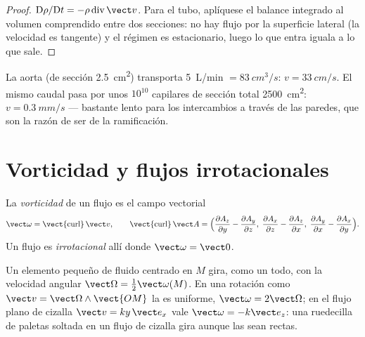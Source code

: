 \begin{proof}
$\mathrm D\rho/\mathrm Dt = -\rho\operatorname{div}\vect v$. Para el tubo,
aplíquese el balance integrado al volumen comprendido entre dos secciones:
no hay flujo por la superficie lateral (la velocidad es tangente) y el
régimen es estacionario, luego lo que entra iguala a lo que sale.
\end{proof}

\begin{example}[La sangre]\label{ex:b2:fluid-kinematics:blood}
La aorta (de sección \qty{2.5}{cm^2}) transporta \qty{5}{L/min} $= \qty{83}{cm^3/s}$:
$v = \qty{33}{cm/s}$. El mismo caudal pasa por unos $10^{10}$
capilares de sección total \qty{2500}{cm^2}: $v = \qty{0.3}{mm/s}$ ---
bastante lento para los intercambios a través de las paredes, que son la razón de ser de la ramificación.
\end{example}

\section{Vorticidad y flujos irrotacionales}

\begin{definition}[Vorticidad]\label{def:b2:fluid-kinematics:vorticity}
La \emph{vorticidad} de un flujo es el campo vectorial
\[
\vect\omega = \operatorname{\vect{curl}}\vect v , \qquad
\operatorname{\vect{curl}}\vect A = \Bigl(\frac{\partial A_z}{\partial y} -
\frac{\partial A_y}{\partial z},\; \frac{\partial A_x}{\partial z} - \frac{\partial A_z}
{\partial x},\; \frac{\partial A_y}{\partial x} - \frac{\partial A_x}{\partial y}\Bigr) .
\]
Un flujo es \emph{irrotacional} allí donde $\vect\omega = \vect 0$.
\end{definition}

\begin{proposition}\label{prop:b2:fluid-kinematics:rotation}
Un elemento pequeño de fluido centrado en $M$ gira, como un todo, con la
velocidad angular $\vect\Omega = \tfrac12\vect\omega(M)$. En una rotación
como  $\vect v = \vect\Omega\wedge\vect{OM}$ la  es uniforme,
$\vect\omega = 2\vect\Omega$; en el flujo plano de cizalla $\vect v = ky\,\vect e_x$
vale $\vect\omega = -k\vect e_z$: una ruedecilla de paletas soltada en un
flujo de cizalla gira aunque las  sean rectas.
\end{proposition}

